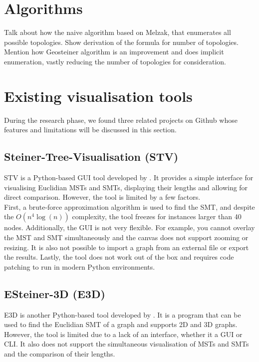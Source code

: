 \documentclass{l4proj}
\begin{document}
\section{Algorithms}

Talk about how the naive algorithm based on Melzak, that enumerates all possible topologies. Show derivation of the formula for number of topologies. Mention how Geosteiner algorithm is an improvement and does implicit enumeration, vastly
reducing the number of topologies for consideration.

\section{Existing visualisation tools}

During the research phase, we found three related projects on Github whose features and limitations will be discussed in this section.

\subsection{Steiner-Tree-Visualisation (STV)}
STV is a Python-based GUI tool developed by \cite{Steiner-Tree-Visualisation}. It provides a simple interface for visualising Euclidian MSTs and SMTs, displaying their lengths and allowing for direct comparison. However, the tool is limited by a few factors.
\\
First, a brute-force approximation algorithm is used to find the SMT, and despite the ${O(n^4 \log(n))}$ complexity, the tool freezes for instances larger than 40 nodes.
Additionally, the GUI is not very flexible. For example, you cannot overlay the MST and SMT simultaneously and the canvas does not support zooming or resizing. It is also not possible to import a graph from an external file or export the results.
Lastly, the tool does not work out of the box and requires code patching to run in modern Python environments.

\subsection{ESteiner-3D (E3D)}
E3D is another Python-based tool developed by \cite{ESteiner-3D}. It is a program that can be used to find the Euclidian SMT of a graph and supports 2D and 3D graphs. However, the tool is limited due to a lack of an interface, whether it a GUI or CLI. It also does not support the simultaneous visualisation of MSTs and SMTs and the comparison of their lengths.
\end{document}
